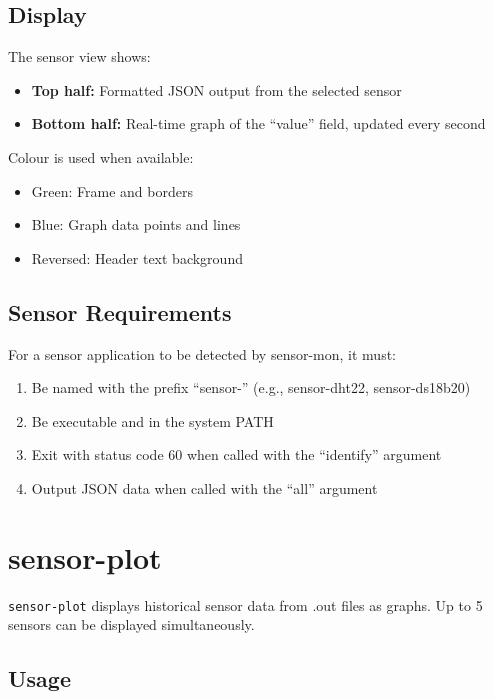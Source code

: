\documentclass[
]{book}
\providecommand{\tightlist}{%
  \setlength{\itemsep}{0pt}\setlength{\parskip}{0pt}}
\begin{document}
\subsection{Display}\label{display}

The sensor view shows:

\begin{itemize}
\tightlist
\item
  \textbf{Top half:} Formatted JSON output from the selected sensor
\item
  \textbf{Bottom half:} Real-time graph of the ``value'' field, updated every second
\end{itemize}

Colour is used when available:

\begin{itemize}
\tightlist
\item
  Green: Frame and borders
\item
  Blue: Graph data points and lines
\item
  Reversed: Header text background
\end{itemize}

\subsection{Sensor Requirements}\label{sensor-requirements}

For a sensor application to be detected by sensor-mon, it must:

\begin{enumerate}
\def\labelenumi{\arabic{enumi}.}
\tightlist
\item
  Be named with the prefix ``sensor-'' (e.g., sensor-dht22, sensor-ds18b20)
\item
  Be executable and in the system PATH
\item
  Exit with status code 60 when called with the ``identify'' argument
\item
  Output JSON data when called with the ``all'' argument
\end{enumerate}

\section{sensor-plot}\label{sensor-plot}

\texttt{sensor-plot} displays historical sensor data from .out files as graphs. Up to 5 sensors can be displayed simultaneously.

\subsection{Usage}\label{usage-1}
\end{document}
